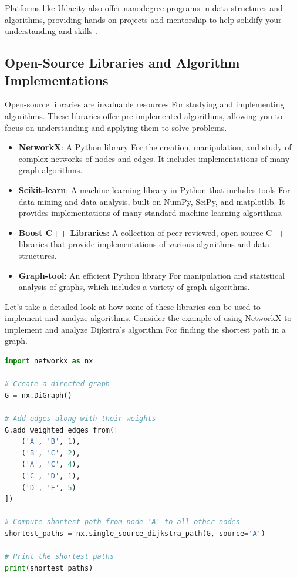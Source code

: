 \documentclass[12pt]{book} %
\begin{document}
Platforms like Udacity also offer nanodegree programs in data structures and algorithms, providing hands-on projects and mentorship to help solidify your understanding and skills .

\subsection{Open-Source Libraries and Algorithm Implementations}
Open-source libraries are invaluable resources For studying and implementing algorithms. These libraries offer pre-implemented algorithms, allowing you to focus on understanding and applying them to solve problems.

\begin{itemize}
    \item \textbf{NetworkX}: A Python library For the creation, manipulation, and study of complex networks of nodes and edges. It includes implementations of many graph algorithms.
    \item \textbf{Scikit-learn}: A machine learning library in Python that includes tools For data mining and data analysis, built on NumPy, SciPy, and matplotlib. It provides implementations of many standard machine learning algorithms.
    \item \textbf{Boost C++ Libraries}: A collection of peer-reviewed, open-source C++ libraries that provide implementations of various algorithms and data structures.
    \item \textbf{Graph-tool}: An efficient Python library For manipulation and statistical analysis of graphs, which includes a variety of graph algorithms.
\end{itemize}

Let's take a detailed look at how some of these libraries can be used to implement and analyze algorithms. Consider the example of using NetworkX to implement and analyze Dijkstra's algorithm For finding the shortest path in a graph.

\FloatBarrier
\begin{lstlisting}[language=Python, caption=Using NetworkX to Implement Dijkstra's Algorithm]
import networkx as nx

# Create a directed graph
G = nx.DiGraph()

# Add edges along with their weights
G.add_weighted_edges_from([
    ('A', 'B', 1),
    ('B', 'C', 2),
    ('A', 'C', 4),
    ('C', 'D', 1),
    ('D', 'E', 5)
])

# Compute shortest path from node 'A' to all other nodes
shortest_paths = nx.single_source_dijkstra_path(G, source='A')

# Print the shortest paths
print(shortest_paths)
\end{lstlisting}
\FloatBarrier
\end{document}
